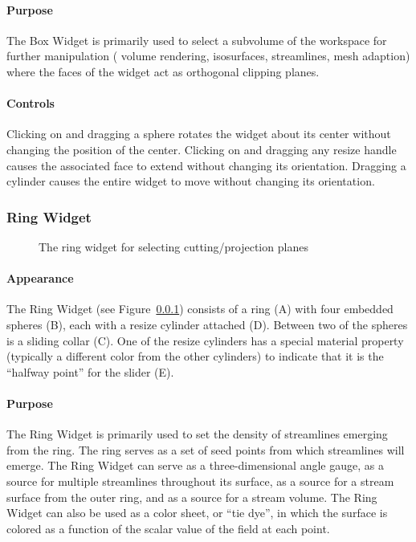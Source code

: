 \paragraph{Purpose} The Box Widget is primarily used to select a
subvolume of the workspace for further manipulation (\eg{} volume
rendering, isosurfaces, streamlines, mesh adaption) where the faces of the
widget act as orthogonal clipping planes.

\paragraph{Controls} Clicking on and dragging a sphere rotates
the widget about its center without changing the position of the center.
Clicking on and dragging any resize handle
causes the associated face to extend without changing its orientation.
Dragging a cylinder causes the entire widget to move without changing its
orientation.

\subsubsection{Ring Widget}
\label{sec:view-ringwidget} 

\begin{figure}[htb]
  \begin{makeimage}
  \end{makeimage}
  \ringwidget
  \caption{\label{fig:ringwidget} The ring widget for selecting
    cutting/projection planes}
\end{figure}


\paragraph{Appearance} The Ring
Widget (see Figure~\ref{sec:view-ringwidget}) consists of a ring (A)
with four embedded spheres (B), each with a resize cylinder
attached (D).  Between two of the spheres is a sliding collar (C).
One of the resize cylinders has a special material property (typically
a different color from the other cylinders) to indicate that it is the
``halfway point'' for the slider (E).

\paragraph{Purpose} The Ring Widget is primarily used to set the
density of streamlines emerging from the ring. The ring serves as a set of
seed points from which streamlines will emerge. The Ring Widget can 
serve as a three-dimensional angle gauge, as a source for multiple
streamlines throughout its surface, as a source for a stream surface from
the outer ring, and as a source for a stream volume.  The Ring Widget can 
also be used as a color sheet, or ``tie dye'', in which the surface is colored as 
a function of the scalar value of the field at each point.


